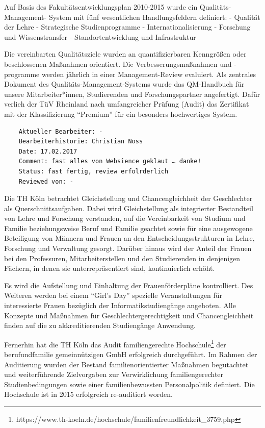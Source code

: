 Auf Basis des Fakultätsentwicklungsplan 2010-2015 wurde ein
Qualitäts-Management- System mit fünf wesentlichen Handlungsfeldern
definiert: - Qualität der Lehre - Strategische Studienprogramme -
Internationalisierung - Forschung und Wissenstransfer -
Standortentwicklung und Infrastruktur

Die vereinbarten Qualitätsziele wurden an quantifizierbaren Kenngrößen
oder beschlossenen Maßnahmen orientiert. Die Verbesserungsmaßnahmen und
-programme werden jährlich in einer Management-Review evaluiert. Als
zentrales Dokument des Qualitäts-Management-Systems wurde das
QM-Handbuch für unsere Mitarbeiter*innen, Studierenden und
Forschungspartner angefertigt. Dafür verlieh der TüV Rheinland nach
umfangreicher Prüfung (Audit) das Zertifikat mit der Klassifizierung
``Premium'' für ein besonders hochwertiges System.

\begin{verbatim}
    Aktueller Bearbeiter: -
    Bearbeiterhistorie: Christian Noss
    Date: 17.02.2017
    Comment: fast alles von Websience geklaut … danke!
    Status: fast fertig, review erfolrderlich
    Reviewed von: -
\end{verbatim}

Die TH Köln betrachtet Gleichstellung und Chancengleichheit der
Geschlechter als Querschnittsaufgaben. Dabei wird Gleichstellung als
integrierter Bestandteil von Lehre und Forschung verstanden, auf die
Vereinbarkeit von Studium und Familie beziehungsweise Beruf und Familie
geachtet sowie für eine ausgewogene Beteiligung von Männern und Frauen
an den Entscheidungsstrukturen in Lehre, Forschung und Verwaltung
gesorgt. Darüber hinaus wird der Anteil der Frauen bei den Professuren,
Mitarbeiterstellen und den Studierenden in denjenigen Fächern, in denen
sie unterrepräsentiert sind, kontinuierlich erhöht.

Es wird die Aufstellung und Einhaltung der Frauenförderpläne
kontrolliert. Des Weiteren werden bei einem ``Girl's Day'' spezielle
Veranstaltungen für interessierte Frauen bezüglich der
Informatikstudiengänge angeboten. Alle Konzepte und Maßnahmen für
Geschlechtergerechtigkeit und Chancengleichheit finden auf die zu
akkreditierenden Studiengänge Anwendung.

Fernerhin hat die TH Köln das Audit familiengerechte
Hochschule\footnote{https://www.th-koeln.de/hochschule/familienfreundlichkeit\_3759.php}
der berufundfamilie gemeinnützigen GmbH erfolgreich durchgeführt. Im
Rahmen der Auditierung wurden der Bestand familienorientierter Maßnahmen
begutachtet und weiterführende Zielvorgaben zur Verwirklichung
familiengerechter Studienbedingungen sowie einer familienbewussten
Personalpolitik definiert. Die Hochschule ist in 2015 erfolgreich
re-auditiert worden.

